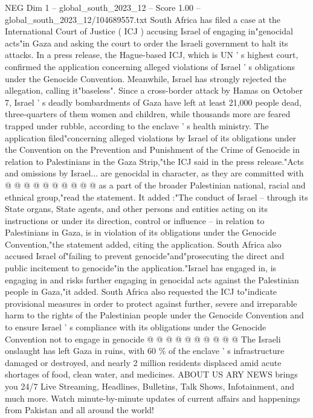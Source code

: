 \begin{textsample}{NEG Dim 1 – global\_south\_2023\_12 – Score 1.00 – global\_south\_2023\_12/104689557.txt}  \label{ex:f1_neg_288}
South Africa has filed a case at the International Court of Justice ( ICJ ) accusing Israel of engaging in"genocidal acts"in Gaza and asking the court to order the Israeli government to halt its attacks.
In a press release, the Hague-based ICJ, which is UN ' s highest court, confirmed the application concerning alleged violations of Israel ' s obligations under the Genocide Convention.
Meanwhile, Israel has strongly rejected the allegation, calling it"baseless".
Since a cross-border attack by Hamas on October 7, Israel ' s deadly bombardments of Gaza have left at least 21,000 people dead, three-quarters of them women and children, while thousands more are feared trapped under rubble, according to the enclave ' s health ministry.
The application filed"concerning alleged violations by Israel of its obligations under the Convention on the Prevention and Punishment of the Crime of Genocide in relation to Palestinians in the Gaza Strip,"the ICJ said in the press release."Acts and omissions by Israel... are genocidal in character, as they are committed with @ @ @ @ @ @ @ @ @ @ as a part of the broader Palestinian national, racial and ethnical group,"read the statement.
It added :"The conduct of Israel -- through its State organs, State agents, and other persons and entities acting on its instructions or under its direction, control or influence -- in relation to Palestinians in Gaza, is in violation of its obligations under the Genocide Convention,"the statement added, citing the application.
South Africa also accused Israel of"failing to prevent genocide"and"prosecuting the direct and public incitement to genocide"in the application."Israel has engaged in, is engaging in and risks further engaging in genocidal acts against the Palestinian people in Gaza,"it added.
South Africa also requested the ICJ to"indicate provisional measures in order to protect against further, severe and irreparable harm to the rights of the Palestinian people under the Genocide Convention and to ensure Israel ' s compliance with its obligations under the Genocide Convention not to engage in genocide @ @ @ @ @ @ @ @ @ @ The Israeli onslaught has left Gaza in ruins, with 60 \% of the enclave ' s infrastructure damaged or destroyed, and nearly 2 million residents displaced amid acute shortages of food, clean water, and medicines.
ABOUT US ARY NEWS brings you 24/7 Live Streaming, Headlines, Bulletins, Talk Shows, Infotainment, and much more.
Watch minute-by-minute updates of current affairs and happenings from Pakistan and all around the world!

\end{textsample}
